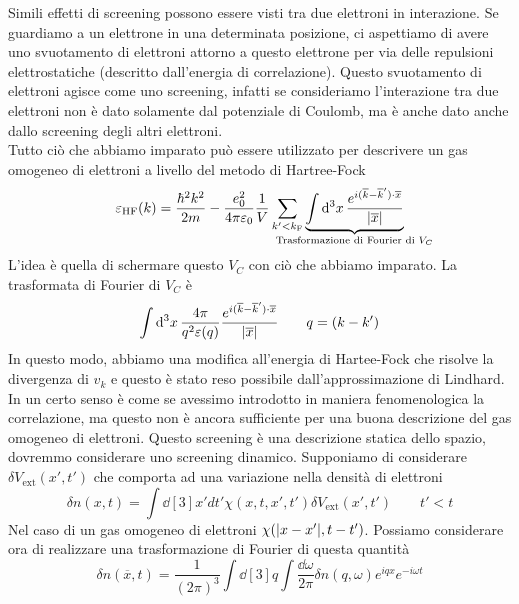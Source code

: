 Simili effetti di screening possono essere visti tra due elettroni in interazione. Se guardiamo a un elettrone in una determinata posizione, ci aspettiamo di avere uno svuotamento di elettroni attorno a questo elettrone per via delle repulsioni elettrostatiche (descritto dall'energia di correlazione). Questo svuotamento di elettroni agisce come uno screening, infatti se consideriamo l'interazione tra due elettroni non è dato solamente dal potenziale di Coulomb, ma è anche dato anche dallo screening degli altri elettroni. \\
Tutto ciò che abbiamo imparato può essere utilizzato per descrivere un gas omogeneo di elettroni a livello del metodo di Hartree-Fock
\begin{equation*}
    \varepsilon_{\text{HF}}(k)=\frac{\hbar^2k^2}{2m}-\frac{e_0^2}{4\pi\varepsilon_0}\frac 1V \sum_{k'<k_{\text F}} \underbrace{\int \dd[3]{x}\frac{e^{i(\overline k - \overline k')\cdot \overline x}}{\abs{\overline x}}}_{\mathclap{\text{Trasformazione di Fourier di }V_C}}
\end{equation*}
L'idea è quella di schermare questo $V_C$ con ciò che abbiamo imparato. La trasformata di Fourier di $V_C$ è
\begin{equation*}
    \int \dd[3]{x}\frac{4\pi}{q^2 \varepsilon(q)}\frac{e^{i(\overline k - \overline k')\cdot \overline x}}{\abs{\overline x}} \qquad q=(k-k')
\end{equation*}
In questo modo, abbiamo una modifica all'energia di Hartee-Fock che risolve la divergenza di $v_k$ e questo è stato reso possibile dall'approssimazione di Lindhard. In un certo senso è come se avessimo introdotto in maniera fenomenologica la correlazione, ma questo non è ancora sufficiente per una buona descrizione del gas omogeneo di elettroni. Questo screening è una descrizione statica dello spazio, dovremmo considerare uno screening dinamico.
Supponiamo di considerare $\delta V_{\text{ext}}(x', t')$ che comporta ad una variazione nella densità di elettroni
\begin{equation*}
    \delta n(x, t)=\int \dd[3]{x'}dt'\chi(x,t, x', t')\delta V_{\text{ext}}(x', t') \qquad t'<t
\end{equation*}
Nel caso di un gas omogeneo di elettroni $\chi(\abs{x-x'}, t-t')$. Possiamo considerare ora di realizzare una trasformazione di Fourier di questa quantità
\begin{equation*}
    \delta n(\overline x,t)= \frac{1}{(2\pi)^3}\int \dd[3]{q} \int \frac{\dd{\omega}}{2\pi}\delta n(q, \omega) e^{iqx}e^{-i\omega t}
\end{equation*}
